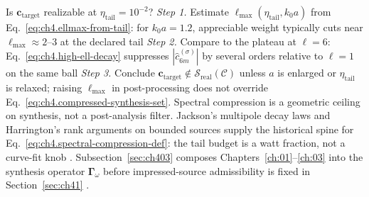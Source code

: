 Is \(\mathbf{c}_{\mathrm{target}}\) realizable at \(\eta_{\mathrm{tail}}=10^{-2}\)?
\emph{Step 1.} Estimate \(\ell_{\max}(\eta_{\mathrm{tail}},k_{0}a)\) from Eq.~\eqref{eq:ch4.ellmax-from-tail}:
for \(k_{0}a=1.2\), appreciable weight typically cuts near \(\ell_{\max}\approx 2\)--\(3\) at the declared tail
\emph{Step 2.} Compare to the plateau at \(\ell=6\): Eq.~\eqref{eq:ch4.high-ell-decay} suppresses
\(|\widehat{c}_{6m}^{(\sigma)}|\) by several orders relative to \(\ell=1\) on the same ball
\emph{Step 3.} Conclude \(\mathbf{c}_{\mathrm{target}}\notin\mathcal{S}_{\mathrm{real}}(\mathcal{C})\) unless
\(a\) is enlarged or \(\eta_{\mathrm{tail}}\) is relaxed; raising \(\ell_{\max}\) in post-processing does not override
Eq.~\eqref{eq:ch4.compressed-synthesis-set}.
Spectral compression is a geometric ceiling on synthesis, not a post-analysis filter.
Jackson's multipole decay laws and Harrington's rank arguments on bounded sources supply the historical spine for Eq.~\eqref{eq:ch4.spectral-compression-def}: the tail budget is a watt fraction, not a curve-fit knob . Subsection~\ref{sec:ch403} composes Chapters~\ref{ch:01}--\ref{ch:03} into the synthesis operator $\boldsymbol{\Gamma}_\omega$ before impressed-source admissibility is fixed in Section~\ref{sec:ch41} .
